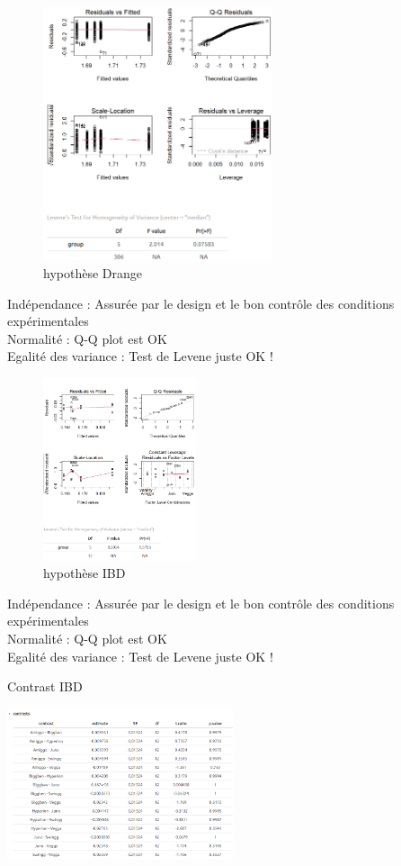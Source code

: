 \label{an:Drange}
\begin{figure}[ht]
\centering
\includegraphics[width=0.6\textwidth]{Image/hypothese Drange.png}
\caption{hypothèse Drange}
\end{figure}
\noindent Indépendance : Assurée par le design et le bon contrôle des conditions expérimentales \\
Normalité : Q-Q plot est OK \\
Egalité des variance : Test de Levene juste OK !

\newpage

\label{an:IBD}
\begin{figure}[ht]
\centering
\includegraphics[width=0.4\textwidth]{Image/hypothese IBD}
\caption{hypothèse IBD}
\end{figure}
\noindent Indépendance : Assurée par le design et le bon contrôle des conditions expérimentales \\
Normalité : Q-Q plot est OK \\
Egalité des variance : Test de Levene juste OK !
\begin{table}[ht]
\centering
\caption{Contrast IBD}
\includegraphics[width=0.5\textwidth]{Image/contrast IBD.png}
\end{table}

